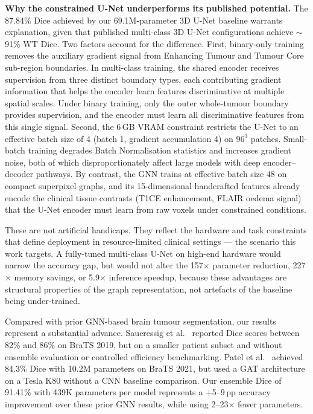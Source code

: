 \documentclass{article}
\begin{document}
\textbf{Why the constrained U-Net underperforms its published potential.}
The 87.84\% Dice achieved by our 69.1M-parameter 3D U-Net baseline warrants
explanation, given that published multi-class 3D U-Net configurations achieve
$\sim$91\% WT Dice. Two factors account for the difference. First, binary-only
training removes the auxiliary gradient signal from Enhancing Tumour and Tumour
Core sub-region boundaries. In multi-class training, the shared encoder receives
supervision from three distinct boundary types, each contributing gradient
information that helps the encoder learn features discriminative at multiple
spatial scales. Under binary training, only the outer whole-tumour boundary
provides supervision, and the encoder must learn all discriminative features from
this single signal. Second, the 6\,GB VRAM constraint restricts the U-Net to an
effective batch size of 4 (batch 1, gradient accumulation 4) on $96^3$ patches.
Small-batch training degrades Batch Normalisation statistics and increases
gradient noise, both of which disproportionately affect large models with deep
encoder--decoder pathways. By contrast, the GNN trains at effective batch size 48
on compact superpixel graphs, and its 15-dimensional handcrafted features already
encode the clinical tissue contrasts (T1CE enhancement, FLAIR oedema signal) that
the U-Net encoder must learn from raw voxels under constrained conditions.

These are not artificial handicaps. They reflect the hardware and task constraints
that define deployment in resource-limited clinical settings --- the scenario this
work targets. A fully-tuned multi-class U-Net on high-end hardware would narrow
the accuracy gap, but would not alter the 157$\times$ parameter reduction,
227$\times$ memory savings, or 5.9$\times$ inference speedup, because these
advantages are structural properties of the graph representation, not artefacts
of the baseline being under-trained.

Compared with prior GNN-based brain tumour segmentation, our results represent a
substantial advance. Saueressig et al.\ \cite{saueressig2021exploring} reported
Dice scores between 82\% and 86\% on BraTS 2019, but on a smaller patient subset
and without ensemble evaluation or controlled efficiency benchmarking. Patel et al.\
\cite{patel2023multiclass} achieved 84.3\% Dice with 10.2M parameters on BraTS
2021, but used a GAT architecture on a Tesla K80 without a CNN baseline comparison.
Our ensemble Dice of 91.41\% with 439K parameters per model represents a
$+$5--9\,pp accuracy improvement over these prior GNN results, while using
2--23$\times$ fewer parameters.
\end{document}
